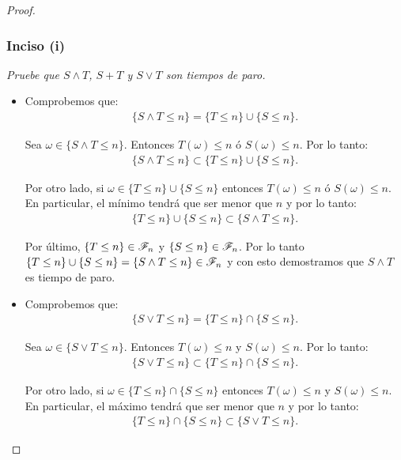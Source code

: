 \begin{proof}
	\subsubsection{Inciso (i)} 
	\emph{
		Pruebe que ${ S \wedge T }$, ${ S + T }$ y ${ S \vee T}$ son tiempos de paro.\\
	}
	
		\begin{itemize}
			\item 
				Comprobemos que:
				\begin{align}
					\{ S \wedge T \leq n \} = \{ T \leq n \} \cup \{ S \leq n\}.
				\end{align}
				
				Sea ${\omega \in \{ S \wedge T \leq n \}}$. Entonces ${T(\omega) \leq n}$ ó ${S(\omega) \leq n}$.
				Por lo tanto:
				\begin{align}
						\{ S \wedge T \leq n \} \subset \{ T \leq n \} \cup \{ S \leq n\}.							
				\end{align}
				
				Por otro lado, si ${\omega \in \{ T \leq n \} \cup \{ S \leq n\}}$ entonces ${T(\omega) \leq n}$ ó ${S(\omega) \leq n}$.
				En particular, el mínimo tendrá que ser menor que ${n}$ y por lo tanto:
				\begin{align}
						\{ T \leq n \} \cup \{ S \leq n\} \subset \{ S \wedge T \leq n \}.						
				\end{align}
				
				Por último, ${\{ T \leq n \} \in \mathscr{F}_n}$ y ${\{ S \leq n \} \in \mathscr{F}_n}$. Por lo tanto	\\	
				${\{ T \leq n \} \cup \{ S \leq n\} = \{ S \wedge T \leq n \} \in \mathscr{F}_n}$ y con esto demostramos que 
				${ S \wedge T}$ es tiempo de paro.\\
				
			\item
				Comprobemos que:
				\begin{align}
					\{ S \vee T \leq n \} = \{ T \leq n \} \cap \{ S \leq n\}.
				\end{align}
				
				Sea ${\omega \in \{ S \vee T \leq n \}}$. Entonces ${T(\omega) \leq n}$ y ${S(\omega) \leq n}$.
				Por lo tanto:
				\begin{align}
						\{ S \vee T \leq n \} \subset \{ T \leq n \} \cap \{ S \leq n\}.							
				\end{align}
				
				Por otro lado, si ${\omega \in \{ T \leq n \} \cap \{ S \leq n\}}$ entonces ${T(\omega) \leq n}$ y ${S(\omega) \leq n}$.
				En particular, el máximo tendrá que ser menor que ${n}$ y por lo tanto:
				\begin{align}
						\{ T \leq n \} \cap \{ S \leq n\} \subset \{ S \vee T \leq n \}.						
				\end{align}
				

\end{itemize}
\end{proof}
